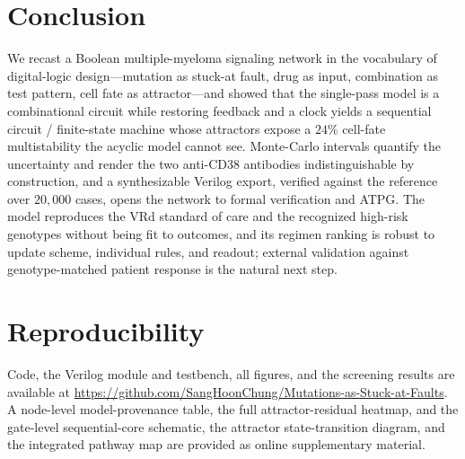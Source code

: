 \documentclass[conference,letterpaper]{IEEEtran}
\begin{document}
\section{Conclusion}\label{sec:concl}
We recast a Boolean multiple-myeloma signaling network in the vocabulary of
digital-logic design---mutation as stuck-at fault, drug as input, combination as
test pattern, cell fate as attractor---and showed that the single-pass model is a
combinational circuit while restoring feedback and a clock yields a sequential
circuit / finite-state machine whose attractors expose a $24\%$ cell-fate
multistability the acyclic model cannot see. Monte-Carlo intervals quantify the
uncertainty and render the two anti-CD38 antibodies indistinguishable by
construction, and a synthesizable Verilog export, verified against the reference
over $20{,}000$ cases, opens the network to formal verification and ATPG. The
model reproduces the VRd standard of care and the recognized high-risk genotypes
without being fit to outcomes, and its regimen ranking is robust to update
scheme, individual rules, and readout; external validation against
genotype-matched patient response is the natural next step.

\section*{Reproducibility}
Code, the Verilog module and testbench, all figures, and the screening results
are available at \url{https://github.com/SangHoonChung/Mutations-as-Stuck-at-Faults}. A node-level model-provenance table,
the full attractor-residual heatmap, and the gate-level sequential-core schematic, the attractor state-transition
diagram, and the integrated pathway map are provided as online supplementary
material.
\end{document}
